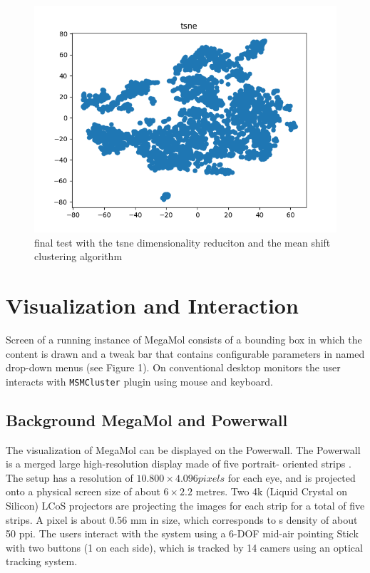 \documentclass[journal]{vgtc}       %
\begin{document}
\begin{figure}[tb]
	\begin{center}
		\includegraphics[width=.75\linewidth]{tsneFull.png}
	\end{center}
	\caption{\label{fig:tsnef} final test with the tsne dimensionality reduciton and the mean shift clustering algorithm }
\end{figure}

\section{Visualization and Interaction}
Screen of a running instance of MegaMol consists of a bounding box in which the content is drawn and a tweak bar that contains configurable parameters in named drop-down menus (see Figure 1). On conventional desktop monitors the user interacts with \verb|MSMCluster| plugin using mouse and keyboard.

\subsection{Background MegaMol and Powerwall}

The visualization of MegaMol can be displayed on the Powerwall.
The  Powerwall is a merged large high-resolution display made of five portrait- oriented
strips . The setup has  a resolution of $10.800 \times 4.096 pixels$
for each eye, and is projected onto a physical screen size of about $6 \times 2.2$ metres. 
Two 4k (Liquid Crystal on Silicon) LCoS projectors are projecting the images for each strip for a total of five strips.
A pixel is about 0.56 mm  in size, which corresponds to s density of about 50 ppi.
The users interact with the system using a 6-DOF mid-air
pointing Stick with two buttons (1 on each side), which is tracked by 14 camers
using an optical tracking system. 
\end{document}
